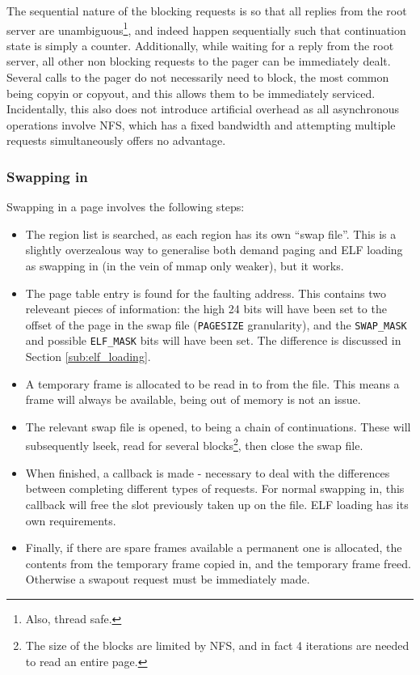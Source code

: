 \documentclass[12pt,english]{article}
\begin{document}
The sequential nature of the blocking requests is so that all replies from the root server are unambiguous\footnote{Also, thread safe.}, and indeed happen sequentially such that continuation state is simply a counter.  Additionally, while waiting for a reply from the root server, all other non blocking requests to the pager can be immediately dealt.  Several calls to the pager do not necessarily need to block, the most common being copyin or copyout, and this allows them to be immediately serviced.  Incidentally, this also does not introduce artificial overhead as all asynchronous operations involve NFS, which has a fixed bandwidth and attempting multiple requests simultaneously offers no advantage.

\subsubsection{Swapping in}

Swapping in a page involves the following steps:
\begin{itemize}
\item The region list is searched, as each region has its own ``swap file''.  This is a slightly overzealous way to generalise both demand paging and ELF loading as swapping in (in the vein of mmap only weaker), but it works.
\item The page table entry is found for the faulting address.  This contains two releveant pieces of information: the high 24 bits will have been set to the offset of the page in the swap file (\texttt{PAGESIZE} granularity), and the \texttt{SWAP\_MASK} and possible \texttt{ELF\_MASK} bits will have been set.  The difference is discussed in Section \ref{sub:elf_loading}.
\item A temporary frame is allocated to be read in to from the file.  This means a frame will always be available, being out of memory is not an issue.
\item The relevant swap file is opened, to being a chain of continuations.  These will subsequently lseek, read for several blocks\footnote{The size of the blocks are limited by NFS, and in fact 4 iterations are needed to read an entire page.}, then close the swap file.
\item When finished, a callback is made - necessary to deal with the differences between completing different types of requests.  For normal swapping in, this callback will free the slot previously taken up on the file.  ELF loading has its own requirements.
\item Finally, if there are spare frames available a permanent one is allocated, the contents from the temporary frame copied in, and the temporary frame freed.  Otherwise a swapout request must be immediately made.
\end{itemize}
\end{document}
